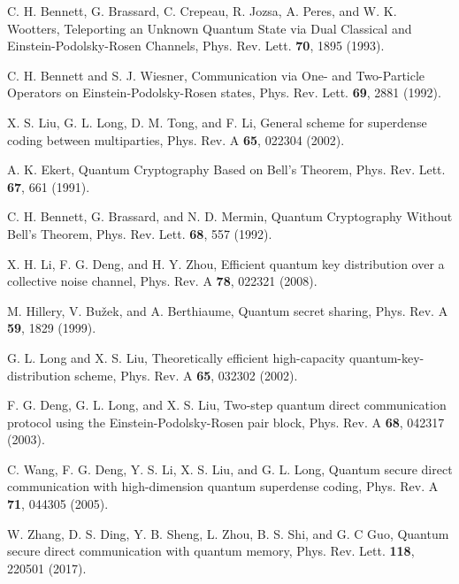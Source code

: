 \documentclass[showpacs,aps,graphicx,twocolumn]{revtex4}
\begin{document}
\begin{thebibliography}{1}

 C. H. Bennett, G. Brassard, C. Crepeau, R. Jozsa, A. Peres,
and W. K. Wootters, Teleporting an Unknown Quantum State via Dual Classical
and Einstein-Podolsky-Rosen Channels, Phys. Rev. Lett. \textbf{70}, 1895 (1993).

 C. H. Bennett and S. J. Wiesner, Communication via
One- and Two-Particle Operators on Einstein-Podolsky-Rosen states,
Phys. Rev. Lett. \textbf{69}, 2881 (1992).

 X. S. Liu, G. L. Long, D. M. Tong, and F. Li,
General scheme for superdense coding between multiparties,
Phys. Rev. A \textbf{65}, 022304 (2002).

 A. K. Ekert, Quantum Cryptography Based on Bell's Theorem,
Phys. Rev. Lett. \textbf{67}, 661 (1991).

 C. H. Bennett, G. Brassard, and N. D. Mermin,
Quantum Cryptography Without Bell's Theorem, Phys. Rev. Lett. \textbf{68}, 557 (1992).


 X. H. Li, F. G. Deng, and H. Y. Zhou,
Efficient quantum key distribution over a collective noise channel,
Phys. Rev. A \textbf{78}, 022321 (2008).


 M. Hillery, V. Bu\v{z}ek, and A. Berthiaume,
Quantum secret sharing, Phys. Rev. A \textbf{59}, 1829 (1999).





 G. L. Long and X. S. Liu,
Theoretically efficient high-capacity quantum-key-distribution scheme,
Phys. Rev. A \textbf{65}, 032302 (2002).

 F. G. Deng, G. L. Long, and X. S. Liu,
Two-step quantum direct communication protocol using the Einstein-Podolsky-Rosen pair block,
Phys. Rev. A \textbf{68}, 042317 (2003).


 C. Wang, F. G. Deng, Y. S. Li,  X. S. Liu,  and G. L.
Long, Quantum secure direct communication with high-dimension
quantum superdense coding, Phys. Rev. A  \textbf{71}, 044305 (2005).


 W. Zhang, D. S. Ding, Y. B. Sheng, L. Zhou, B. S. Shi, and G. C Guo,
Quantum secure direct communication with quantum memory,
Phys. Rev. Lett. \textbf{118}, 220501 (2017).








\end{thebibliography}
\end{document}
